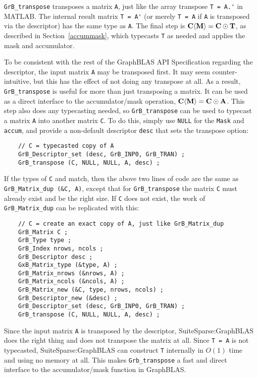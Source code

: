 \documentclass[12pt]{article}
\begin{document}
\verb'GrB_transpose'
transposes a matrix \verb'A', just like the array transpose \verb"T = A.'" in
MATLAB.  The internal result matrix \verb"T = A'" (or merely \verb"T = A" if
\verb'A' is transposed via the descriptor) has the same type as \verb'A'.  The
final step is ${\bf C \langle M \rangle  = C \odot T}$, as described in
Section~\ref{accummask}, which typecasts \verb'T' as needed and applies the
mask and accumulator.

To be consistent with the rest of the GraphBLAS API Specification regarding the
descriptor, the input matrix \verb'A' may be transposed first.  It may seem
counter-intuitive, but this has the effect of not doing any transpose at all.
As a result, \verb'GrB_transpose' is useful for more than just transposing a
matrix.  It can be used as a direct interface to the accumulator/mask
operation, ${\bf C \langle M \rangle  = C \odot A}$.  This step also does any
typecasting needed, so \verb'GrB_transpose' can be used to typecast a matrix
\verb'A' into another matrix \verb'C'.  To do this, simply use \verb'NULL' for
the \verb'Mask' and \verb'accum', and provide a non-default descriptor
\verb'desc' that sets the transpose option:

    {\footnotesize
    \begin{verbatim}
    // C = typecasted copy of A
    GrB_Descriptor_set (desc, GrB_INP0, GrB_TRAN) ;
    GrB_transpose (C, NULL, NULL, A, desc) ; \end{verbatim}}

If the types of \verb'C' and match, then the above two lines of code are the
same as \verb'GrB_Matrix_dup (&C, A)', except that for \verb'GrB_transpose' the
matrix \verb'C' must already exist and be the right size.  If \verb'C' does not
exist, the work of \verb'GrB_Matrix_dup' can be replicated with this:

    {\footnotesize
    \begin{verbatim}
    // C = create an exact copy of A, just like GrB_Matrix_dup
    GrB_Matrix C ;
    GrB_Type type ;
    GrB_Index nrows, ncols ;
    GrB_Descriptor desc ;
    GxB_Matrix_type (&type, A) ;
    GrB_Matrix_nrows (&nrows, A) ;
    GrB_Matrix_ncols (&ncols, A) ;
    GrB_Matrix_new (&C, type, nrows, ncols) ;
    GrB_Descriptor_new (&desc) ;
    GrB_Descriptor_set (desc, GrB_INP0, GrB_TRAN) ;
    GrB_transpose (C, NULL, NULL, A, desc) ; \end{verbatim}}

Since the input matrix \verb'A' is transposed by the descriptor,
SuiteSparse:Graph\-BLAS does the right thing and does not transpose the matrix
at all.  Since \verb'T = A' is not typecasted, SuiteSparse:GraphBLAS can
construct \verb'T' internally in $O(1)$ time and using no memory at all.   This
makes \verb'Grb_transpose' a fast and direct interface to the accumulator/mask
function in GraphBLAS.
\end{document}
